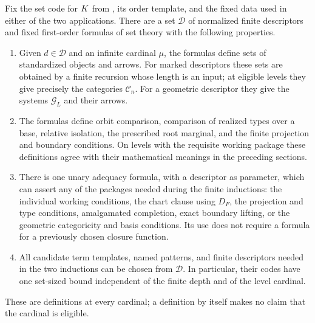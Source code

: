 \begin{proposition}
\label{close:uniform-definitions}
Fix the set code for $K$ from
, its order template, and the fixed
data used in either of the two applications.  There are a set $\mathcal D$
of normalized finite descriptors and fixed first-order formulas of set
theory with the following properties.
\begin{enumerate}
\item Given $d\in\mathcal D$ and an infinite cardinal $\mu$, the formulas
define sets of standardized objects and arrows.  For marked descriptors
these sets are obtained by a finite recursion whose length is an input;
at eligible levels they give precisely the categories $\mathcal C_n$.
For a geometric descriptor they give the systems $\mathcal G_L$ and their
arrows.
\item The formulas define orbit comparison, comparison of realized types
over a base, relative isolation, the prescribed root marginal, and the
finite projection and boundary conditions.  On levels with the requisite
working package these definitions agree with their mathematical meanings
in the preceding sections.
\item There is one unary adequacy formula, with a descriptor as parameter,
which can assert any of the packages needed during the finite inductions:
the individual working conditions, the chart clause using $D_F$, the
projection and type conditions, amalgamated completion, exact boundary
lifting, or the geometric categoricity and basis conditions.  Its use
does not require a formula for a previously chosen closure function.
\item All candidate term templates, named patterns, and finite descriptors
needed in the two inductions can be chosen from $\mathcal D$.  In
particular, their codes have one set-sized bound independent of the
finite depth and of the level cardinal.
\end{enumerate}
These are definitions at every cardinal; a definition by itself makes no
claim that the cardinal is eligible.
\end{proposition}

